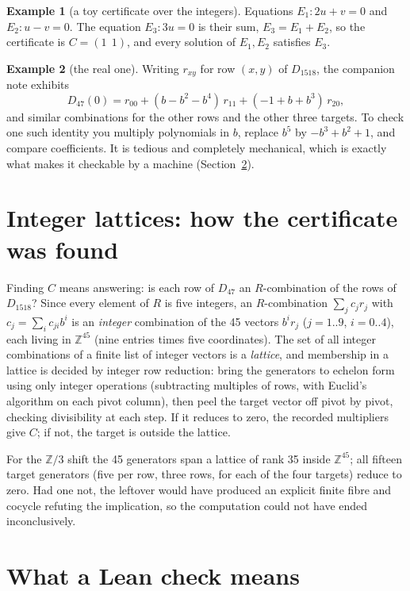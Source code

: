 \documentclass[11pt]{article}
\theoremstyle{definition}\newtheorem{example}{Example}\newtheorem{exercise}{Exercise}
\theoremstyle{remark}\newtheorem*{remark}{Remark}
\newcommand{\Z}{\mathbb{Z}}
\begin{document}
\begin{example}[a toy certificate over the integers]
Equations $E_1: 2u+v=0$ and $E_2: u-v=0$. The equation $E_3: 3u=0$ is their sum, $E_3=E_1+E_2$, so the certificate is $C=(1\ \ 1)$, and every solution of $E_1,E_2$ satisfies $E_3$.
\end{example}

\begin{example}[the real one]
Writing $r_{xy}$ for row $(x,y)$ of $D_{1518}$, the companion note exhibits
\[
D_{47}(0) = r_{00}+(b-b^2-b^4)\,r_{11}+(-1+b+b^3)\,r_{20},
\]
and similar combinations for the other rows and the other three targets. To check one such identity you multiply polynomials in $b$, replace $b^5$ by $-b^3+b^2+1$, and compare coefficients. It is tedious and completely mechanical, which is exactly what makes it checkable by a machine (Section~\ref{sec:lean}).
\end{example}

\section{Integer lattices: how the certificate was found}\label{sec:lattice}

Finding $C$ means answering: is each row of $D_{47}$ an $R$-combination of the rows of $D_{1518}$? Since every element of $R$ is five integers, an $R$-combination $\sum_j c_j r_j$ with $c_j = \sum_i c_{ji}b^i$ is an \emph{integer} combination of the 45 vectors $b^i r_j$ ($j=1..9$, $i=0..4$), each living in $\Z^{45}$ (nine entries times five coordinates). The set of all integer combinations of a finite list of integer vectors is a \emph{lattice}, and membership in a lattice is decided by integer row reduction: bring the generators to echelon form using only integer operations (subtracting multiples of rows, with Euclid's algorithm on each pivot column), then peel the target vector off pivot by pivot, checking divisibility at each step. If it reduces to zero, the recorded multipliers give $C$; if not, the target is outside the lattice.

For the $\Z/3$ shift the 45 generators span a lattice of rank 35 inside $\Z^{45}$; all fifteen target generators (five per row, three rows, for each of the four targets) reduce to zero. Had one not, the leftover would have produced an explicit finite fibre and cocycle refuting the implication, so the computation could not have ended inconclusively.

\section{What a Lean check means}\label{sec:lean}
\end{document}
